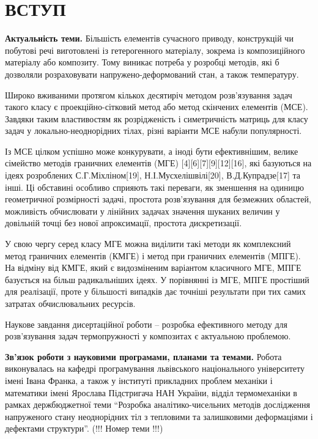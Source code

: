 \chapter{ВСТУП}

\nocite{bahvalov-et-al,benerdge-et-al} 

\textbf{Актуальність теми.} 
Більшість елементів сучасного приводу, конструкцій чи побутові речі виготовлені із гетерогенного матеріалу, зокрема із композиційного матеріалу або композиту. Тому виникає потреба у розробці методів, які б дозволяли розраховувати напружено-деформований стан, а також температуру.

Широко вживаними протягом кількох десятиріч методом розв'язування задач такого класу є проекційно-сітковий метод або метод скінчених елементів (МСЕ). Завдяки таким властивостям як розрідженість і симетричність матриць для класу задач у локально-неоднорідних тілах, різні варіанти МСЕ набули популярності.

Із МСЕ цілком успішно може конкурувати, а іноді бути ефективнішим,
велике сімейство методів граничних елементів
(МГЕ) \cite{benerdge-et-al} {[}4{]}{[}6{]}{[}7{]}{[}9{]}{[}12{]}{[}16{]}, які базуються
на ідеях розроблених С.Г.Міхліном{[}19{]}, Н.І.Мусхелішвілі{[}20{]},
В.Д.Купрадзе{[}17{]} та інші. Ці обставині особливо сприяють такі
переваги, як зменшення на одиницю геометричної розмірності задачі,
простота розв'язування для безмежних областей, можливість обчислювати у
лінійних задачах значення шуканих величин у довільній точці без нової
апроксимації, простота дискретизації.

У свою чергу серед класу МГЕ можна виділити такі методи як комплексний
метод граничних елементів (КМГЕ) і метод при граничних елементів (МПГЕ).
На відміну від КМГЕ, який є видозміненим варіантом класичного МГЕ, МПГЕ
базується на більш радикальніших ідеях. У порівнянні із МГЕ, МПГЕ
простіший для реалізації, проте у більшості випадків дає точніші
результати при тих самих затратах обчислювальних ресурсів.

Наукове завдання дисертаційної роботи -- розробка ефективного методу для
розв'язування задач термопружності у композитах є актуальною проблемою.

\textbf{Зв'язок роботи з науковими програмами, планами та
темами.} Робота виконувалась на кафедрі програмування львівського
національного університету імені Івана Франка, а також у інституті
прикладних проблем механіки і математики імені Ярослава Підстригача НАН
України, відділ термомеханіки в рамках держбюджетної теми ``Розробка
аналітико-чисельних методів дослідження напруженого стану неоднорідних
тіл з тепловими та залишковими деформаціями і дефектами структури''.
(!!! Номер теми !!!)

